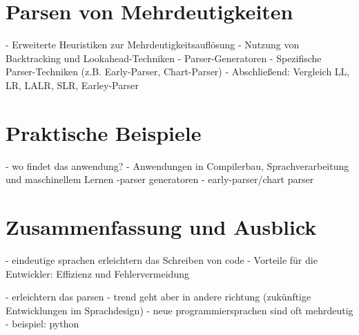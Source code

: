 \documentclass[runningheads]{llncs}
\begin{document}
\section{Parsen von Mehrdeutigkeiten}
- Erweiterte Heuristiken zur Mehrdeutigkeitsauflösung
- Nutzung von Backtracking und Lookahead-Techniken
- Parser-Generatoren
- Spezifische Parser-Techniken (z.B. Early-Parser, Chart-Parser)
- Abschließend: Vergleich LL, LR, LALR, SLR, Earley-Parser

\section{Praktische Beispiele}
- wo findet das anwendung?
- Anwendungen in Compilerbau, Sprachverarbeitung und maschinellem Lernen
-parser generatoren
- early-parser/chart parser

\section{Zusammenfassung und Ausblick}
- eindeutige sprachen erleichtern das Schreiben von code
- Vorteile für die Entwickler: Effizienz und Fehlervermeidung

- erleichtern das parsen
- trend geht aber in andere richtung (zukünftige Entwicklungen im Sprachdesign)
- neue programmiersprachen sind oft mehrdeutig
- beispiel: python

%
%
%


\end{document}
